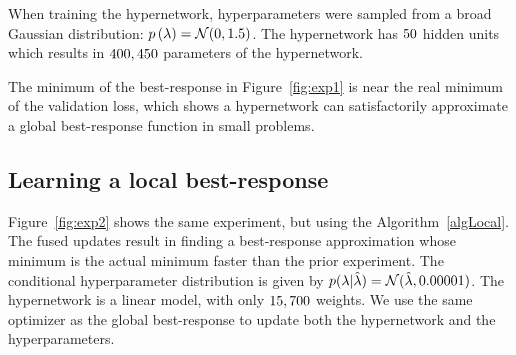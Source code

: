 \documentclass{article} %
\newcommand{\prior}[1]{p \left( #1 \right)} %
\newcommand{\hyper}{\lambda} %
\newcommand{\hyperFixed}{\hyper} %
\newcommand{\hyperDist}{\prior{\hyper}} %
\newcommand{\sampleRename}[1]{#1} %
\newcommand{\curRename}[1]{\smash{\hat{#1}}} %
\newcommand{\hyperDistVar}{p ( \sampleRename{\hyper} | \curRename{\hyper} )} %
\begin{document}
When training the hypernetwork, hyperparameters were sampled from a broad Gaussian distribution: $\hyperDist = \mathcal{N} ( \hyperMeanGlobal, \hyperVarGlobal )$.
The hypernetwork has $50$ hidden units which results in $400,450$ parameters of the hypernetwork.

The minimum of the best-response in Figure~\ref{fig:exp1} is near the real minimum of the validation loss, which shows a hypernetwork can satisfactorily approximate a global best-response function in small problems.

\subsection{Learning a local best-response}
Figure~\ref{fig:exp2} shows the same experiment, but using the Algorithm~\ref{algLocal}.
The fused updates result in finding a best-response approximation whose minimum is the actual minimum faster than the prior experiment.
The conditional hyperparameter distribution is given by $\hyperDistVar = \mathcal{N} ( \curRename{\hyperFixed}, 0.00001)$.
The hypernetwork is a linear model, with only $15,700$ weights.
We use the same optimizer as the global best-response to update both the hypernetwork and the hyperparameters.
\end{document}

